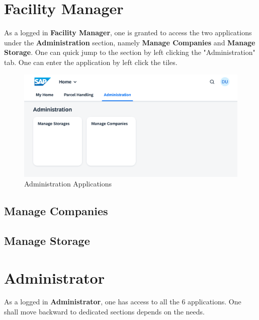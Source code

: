 \pagebreak

\section{Facility Manager}

As a logged in \textbf{Facility Manager}, one is granted to access the two applications under the \textbf{Administration} section, namely \textbf{Manage Companies} and \textbf{Manage Storage}. One can quick jump to the section by left clicking the "Administration" tab. One can enter the application by left click the tiles.

\begin{figure}[H]
	\centering
	\includegraphics[width=1\linewidth]{images/user_doc/overviews/AdminTab.png}
	\caption{Administration Applications}
	\label{fig:AdministrationApplications}
\end{figure}


\subsection{Manage Companies}


\subsection{Manage Storage}


\section{Administrator}
As a logged in \textbf{Administrator}, one has access to all the 6 applications. One shall move backward to dedicated sections depends on the needs. 